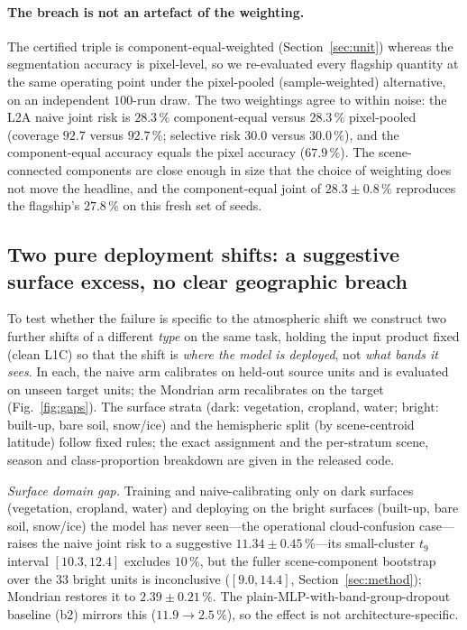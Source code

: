 \documentclass[preprint,3p,times]{elsarticle}
\begin{document}
\paragraph{The breach is not an artefact of the weighting.} The certified triple is component-equal-weighted (Section~\ref{sec:unit}) whereas the segmentation accuracy is pixel-level, so we re-evaluated every flagship quantity at the same operating point under the pixel-pooled (sample-weighted) alternative, on an independent $100$-run draw. The two weightings agree to within noise: the L2A naive joint risk is $28.3\,\%$ component-equal versus $28.3\,\%$ pixel-pooled (coverage $92.7$ versus $92.7\,\%$; selective risk $30.0$ versus $30.0\,\%$), and the component-equal accuracy equals the pixel accuracy ($67.9\,\%$). The scene-connected components are close enough in size that the choice of weighting does not move the headline, and the component-equal joint of $28.3 \pm 0.8\,\%$ reproduces the flagship's $27.8\,\%$ on this fresh set of seeds.

\subsection{Two pure deployment shifts: a suggestive surface excess, no clear geographic breach}
\label{sec:deployment}
To test whether the failure is specific to the atmospheric shift we construct two further shifts of a different \emph{type} on the same task, holding the input product fixed (clean L1C) so that the shift is \emph{where the model is deployed}, not \emph{what bands it sees}. In each, the naive arm calibrates on held-out source units and is evaluated on unseen target units; the Mondrian arm recalibrates on the target (Fig.~\ref{fig:gaps}). The surface strata (dark: vegetation, cropland, water; bright: built-up, bare soil, snow/ice) and the hemispheric split (by scene-centroid latitude) follow fixed rules; the exact assignment and the per-stratum scene, season and class-proportion breakdown are given in the released code.

\emph{Surface domain gap.} Training and naive-calibrating only on dark surfaces (vegetation, cropland, water) and deploying on the bright surfaces (built-up, bare soil, snow/ice) the model has never seen---the operational cloud-confusion case---raises the naive joint risk to a suggestive $11.34 \pm 0.45\,\%$---its small-cluster $t_9$ interval $[10.3, 12.4]$ excludes $10\,\%$, but the fuller scene-component bootstrap over the $33$ bright units is inconclusive ($[9.0, 14.4]$, Section~\ref{sec:method}); Mondrian restores it to $2.39 \pm 0.21\,\%$. The plain-MLP-with-band-group-dropout baseline (b2) mirrors this ($11.9 \to 2.5\,\%$), so the effect is not architecture-specific.
\end{document}
